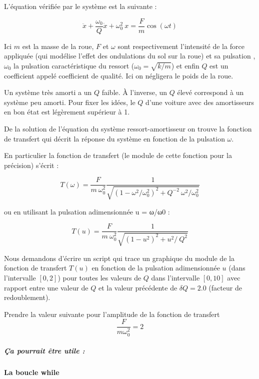 \documentclass{article}
\begin{document}
    L'équation vérifiée par le système est la suivante :

\[ \ddot{x} + \frac{\omega_0}{Q} \dot{x} + \omega_0^2\ x = \frac{F}{m} \cos( \omega t) \]

    Ici \(m\) est la masse de la roue, \(F\) et \(\omega\) sont
respectivement l'intensité de la force appliquée (qui modélise l'effet
des ondulations du sol sur la roue) et sa pulsation , \(\omega_0\) la
pulsation caractéristique du ressort (\(\omega_0=\sqrt{k/m}\)) et enfin
\(Q\) est un coefficient appelé coefficient de qualité. Ici on négligera
le poids de la roue.

Un système très amorti a un \(Q\) faible. À l'inverse, un \(Q\) élevé
correspond à un système peu amorti. Pour fixer les idées, le \(Q\) d'une
voiture avec des amortisseurs en bon état est légèrement supérieur à 1.

    De la solution de l'équation du système ressort-amortisseur on trouve la
fonction de transfert qui décrit la réponse du système en fonction de la
pulsation \(\omega\).

En particulier la fonction de transfert (le module de cette fonction
pour la précision) s'écrit :

    \[ T(\omega) = \frac{F}{m \ \omega_0^2} \frac{1}{\sqrt{ \left( 1 - \omega^2/\omega_0^2 \right)^2 +  Q^{-2} \ \omega^2/\omega_0^2 }} \]

    ou en utilisant la pulsation adimensionnée u = ω/ω0 :

    \[ T(u) = \frac{F}{m \ \omega_0^2} \frac{1}{\sqrt{ \left( 1 - u^2 \right)^2 +  u^{2}/ \      Q^2}} \]

    Nous demandons d'écrire un script qui trace un graphique du module de la
fonction de transfert \(T(u)\) en fonction de la pulsation adimensionnée
\(u\) (dans l'intervalle \([0,2]\)) pour toutes les valeurs de \(Q\)
dans l'intervalle \([0,10]\) avec rapport entre une valeur de \(Q\) et
la valeur précédente de \(\delta Q = 2.0\) (facteur de redoublement).

    Prendre la valeur suivante pour l'amplitude de la fonction de transfert
\[ \frac{F}{m \omega_0^2} = 2 \]

    \subparagraph{Ça pourrait être utile
:}\label{uxe7a-pourrait-uxeatre-utile}

    \paragraph{La boucle while}\label{la-boucle-while}
\end{document}
